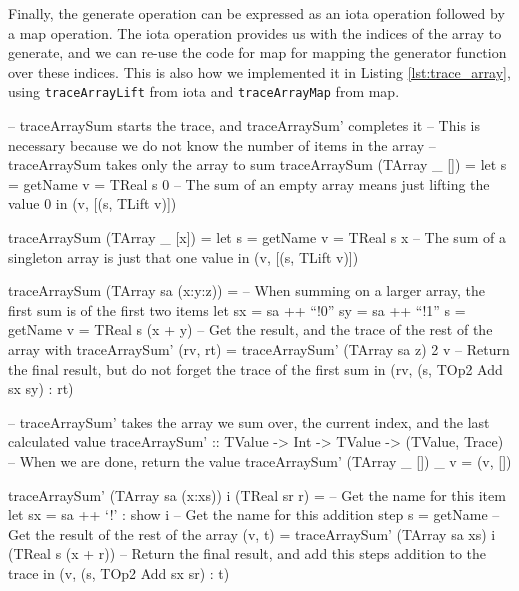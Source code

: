         Finally, the generate operation can be expressed as an iota operation followed by a map operation.
        The iota operation provides us with the indices of the array to generate, and we can re-use the code for map for mapping the generator function over these indices.
        This is also how we implemented it in Listing \ref{lst:trace_array}, using \texttt{traceArrayLift} from iota and \texttt{traceArrayMap} from map.

        \begin{haskell}[caption=Tracing the sum operator, label=lst:trace_sum, gobble=12]
            -- traceArraySum starts the trace, and traceArraySum' completes it
            -- This is necessary because we do not know the number of items in the array
            -- traceArraySum takes only the array to sum
            traceArraySum (TArray _ []) =
                let s = getName
                    v = TReal s 0
                -- The sum of an empty array means just lifting the value 0
                in  (v, [(s, TLift v)])

            traceArraySum (TArray _ [x]) =
                let s = getName
                    v = TReal s x
                -- The sum of a singleton array is just that one value
                in  (v, [(s, TLift v)])

            traceArraySum (TArray sa (x:y:z)) =
                -- When summing on a larger array, the first sum is of the first two items
                let sx = sa ++ ``!0''
                    sy = sa ++ ``!1''
                    s  = getName
                    v  = TReal s (x + y)
                    -- Get the result, and the trace of the rest of the array with traceArraySum'
                    (rv, rt) = traceArraySum' (TArray sa z) 2 v
                -- Return the final result, but do not forget the trace of the first sum
                in  (rv, (s, TOp2 Add sx sy) : rt)

            -- traceArraySum' takes the array we sum over, the current index, and the last calculated value
            traceArraySum' :: TValue -> Int -> TValue -> (TValue, Trace)
            -- When we are done, return the value
            traceArraySum' (TArray _ []) _ v = (v, [])
            
            traceArraySum' (TArray sa (x:xs)) i (TReal sr r) =
                -- Get the name for this item
                let sx = sa ++ `!' : show i
                    -- Get the name for this addition step
                    s  = getName
                    -- Get the result of the rest of the array
                    (v, t) = traceArraySum' (TArray sa xs) i (TReal s (x + r))
                -- Return the final result, and add this steps addition to the trace
                in  (v, (s, TOp2 Add sx sr) : t)
        \end{haskell}

